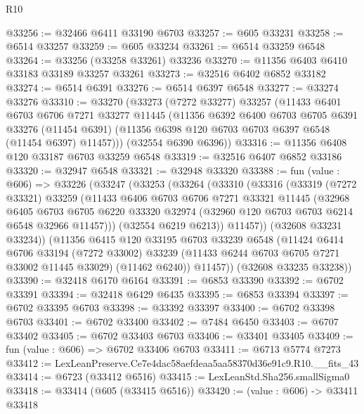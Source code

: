 \begin{lexlean}{R10}
\begin{coremodule}
@33256 := @32466 @6411 @33190 @6703
@33257 := @605 @33231
@33258 := @6514 @33257
@33259 := @605 @33234
@33261 := @6514 @33259 @6548
@33264 := @33256 (@33258 @33261) @33236
@33270 := @11356 @6403 @6410 @33183 @33189 @33257 @33261
@33273 := @32516 @6402 @6852 @33182
@33274 := @6514 @6391
@33276 := @6514 @6397 @6548
@33277 := @33274 @33276
@33310 := @33270
    (@33273
      (@7272 @33277)
      @33257
      (@11433
        @6401
        @6703
        @6706
        @7271
        @33277
        @11445
        (@11356
          @6392
          @6400
          @6703
          @6705
          @6391
          @33276
          (@11454 @6391)
          (@11356 @6398 @120 @6703 @6703 @6397 @6548 (@11454 @6397) @11457)))
      (@32554 @6390 @6396))
@33316 := @11356 @6408 @120 @33187 @6703 @33259 @6548
@33319 := @32516 @6407 @6852 @33186
@33320 := @32947 @6548
@33321 := @32948 @33320
@33388 := fun (value : @606) =>
  @33226
    (@33247
      (@33253
        (@33264
          (@33310
            (@33316
              (@33319
                (@7272 @33321)
                @33259
                (@11433
                  @6406
                  @6703
                  @6706
                  @7271
                  @33321
                  @11445
                  (@32968
                    @6405
                    @6703
                    @6705
                    @6220
                    @33320
                    @32974
                    (@32960 @120 @6703 @6703 @6214 @6548 @32966 @11457)))
                (@32554 @6219 @6213))
              @11457))
          (@32608 @33231 @33234))
        (@11356
          @6415
          @120
          @33195
          @6703
          @33239
          @6548
          (@11424
            @6414
            @6706
            @33194
            (@7272 @33002)
            @33239
            (@11433 @6244 @6703 @6705 @7271 @33002 @11445 @33029)
            (@11462 @6240))
          @11457))
      (@32608 @33235 @33238))
@33390 := @32418 @6170 @6164
@33391 := @6853 @33390
@33392 := @6702 @33391
@33394 := @32418 @6429 @6435
@33395 := @6853 @33394
@33397 := @6702 @33395 @6703
@33398 := @33392 @33397
@33400 := @6702 @33398 @6703
@33401 := @6702 @33400
@33402 := @7484 @6450
@33403 := @6707 @33402
@33405 := @6702 @33403 @6703
@33406 := @33401 @33405
@33409 := fun (value : @606) => @6702 @33406 @6703
@33411 := @6713 @5774 @7273
@33412 := LexLeanPreserve.Ce7e4dac58aefdeaa5aa58370d36e91c9.R10.__fits_43
@33414 := @6723 (@33412 @6516)
@33415 := LexLeanStd.Sha256.smallSigma0
@33418 := @33414 (@605 (@33415 @6516))
@33420 := (value : @606) -> @33411 @33418

\end{coremodule}
\end{lexlean}

